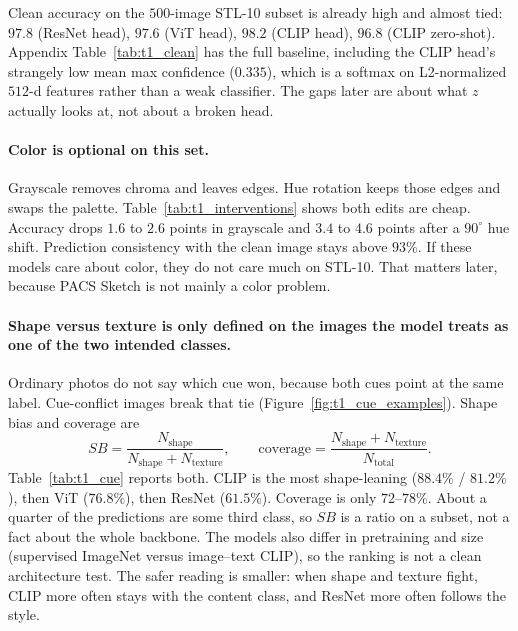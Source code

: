 \documentclass{article}
\begin{document}
Clean accuracy on the $500$-image STL-10 subset is already high and almost tied: $97.8$ (ResNet head), $97.6$ (ViT head), $98.2$ (CLIP head), $96.8$ (CLIP zero-shot).
Appendix Table~\ref{tab:t1_clean} has the full baseline, including the CLIP head's strangely low mean max confidence ($0.335$), which is a softmax on L2-normalized $512$-d features rather than a weak classifier.
The gaps later are about what $z$ actually looks at, not about a broken head.

\paragraph{Color is optional on this set.}
Grayscale removes chroma and leaves edges.
Hue rotation keeps those edges and swaps the palette.
Table~\ref{tab:t1_interventions} shows both edits are cheap.
Accuracy drops $1.6$ to $2.6$ points in grayscale and $3.4$ to $4.6$ points after a $90^\circ$ hue shift.
Prediction consistency with the clean image stays above $93\%$.
If these models care about color, they do not care much on STL-10.
That matters later, because PACS Sketch is not mainly a color problem.

\begin{table}[t]
  \centering
  \caption{Clean accuracy and the effect of removing color, swapping hue, or destroying patch order.
  Consistency is agreement with the clean prediction on the same image.}
  \label{tab:t1_interventions}
  \small\setlength{\tabcolsep}{4pt}
  
\end{table}

\paragraph{Shape versus texture is only defined on the images the model treats as one of the two intended classes.}
Ordinary photos do not say which cue won, because both cues point at the same label.
Cue-conflict images break that tie (Figure~\ref{fig:t1_cue_examples}).
Shape bias and coverage are
\begin{equation}
  SB=\frac{N_{\mathrm{shape}}}{N_{\mathrm{shape}}+N_{\mathrm{texture}}},
  \qquad
  \mathrm{coverage}=\frac{N_{\mathrm{shape}}+N_{\mathrm{texture}}}{N_{\mathrm{total}}}.
  \label{eq:sb}
\end{equation}
Table~\ref{tab:t1_cue} reports both.
CLIP is the most shape-leaning ($88.4\%$ / $81.2\%$), then ViT ($76.8\%$), then ResNet ($61.5\%$).
Coverage is only $72$--$78\%$.
About a quarter of the predictions are some third class, so $SB$ is a ratio on a subset, not a fact about the whole backbone.
The models also differ in pretraining and size (supervised ImageNet versus image--text CLIP), so the ranking is not a clean architecture test.
The safer reading is smaller: when shape and texture fight, CLIP more often stays with the content class, and ResNet more often follows the style.
\end{document}
